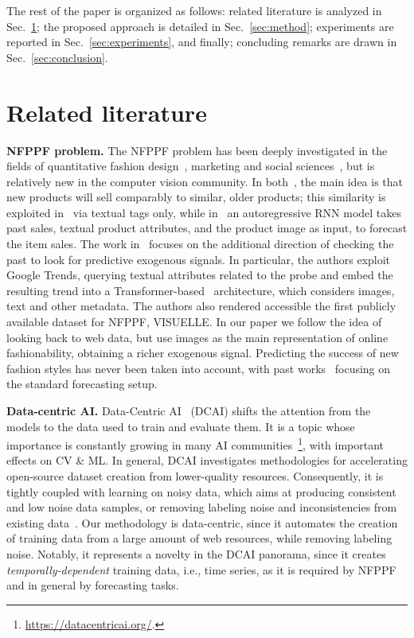 \documentclass[runningheads]{llncs}
\begin{document}
The rest of the paper is organized as follows: related literature is analyzed in Sec.~\ref{sec:related}; the proposed approach is detailed in Sec.~\ref{sec:method}; experiments are reported in Sec.~\ref{sec:experiments}, and finally; concluding remarks are drawn in Sec.~\ref{sec:conclusion}.

 
\section{Related literature}
\label{sec:related}
\textbf{NFPPF problem.} 
The NFPPF problem has been deeply investigated in the fields of quantitative fashion design~\cite{ren2017comparative,arvan2019integrating,jeon2020fashionq}, marketing and social sciences~\cite{silva2019googling,garcia2021fashion}, but is relatively new in the computer vision community. In both~\cite{ekambaram_attention_2020,singh_fashion_2019}, the main idea is that new products will sell comparably to similar, older products; this similarity is exploited in~\cite{singh_fashion_2019} via textual tags only, while in~\cite{ekambaram_attention_2020} an autoregressive RNN model takes past sales, textual product attributes, and the product image as input, to forecast the item sales. The work in~\cite{skenderi2021well} focuses on the additional direction of checking the past to look for predictive exogenous signals. In particular, the authors exploit Google Trends, querying textual attributes related to the probe and embed the resulting trend into a Transformer-based~\cite{vaswani2017attention} architecture, which considers images, text and other metadata. The authors also rendered accessible the first publicly available dataset for NFPPF, VISUELLE. In our paper we follow the idea of looking back to web data, but use images as the main representation of online fashionability, obtaining a richer exogenous signal. Predicting the success of new fashion styles has never been taken into account, with past works~\cite{al2017fashion,lo_dressing_2019,ma_knowledge_2020} focusing on the standard forecasting setup.

\textbf{Data-centric AI.} Data-Centric AI~\cite{motamedi2021data} (DCAI) shifts the attention from the models to the data used to train and evaluate them. It is a topic whose importance is constantly growing in many AI communities~\cite{anik2021data,northcutt2021pervasive,NG:2021}\footnote{\url{https://datacentricai.org/}.}, with important effects on CV \& ML. In general, DCAI investigates methodologies for accelerating open-source dataset creation from lower-quality resources. Consequently, it is tightly coupled with learning on noisy data, which aims at producing consistent and low noise data samples, or removing labeling noise and inconsistencies from existing data~\cite{northcutt2021confident,song2019selfie,wang2019symmetric}. Our methodology is data-centric, since it automates the creation of training data from a large amount of web resources, while removing labeling noise. Notably, it represents a novelty in the DCAI panorama, since it creates \emph{temporally-dependent} training data, i.e., time series, as it is required by NFPPF and in general by forecasting tasks. 
\end{document}

